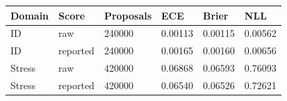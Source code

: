 \begin{tabular}{llllll}
\toprule
Domain & Score & Proposals & ECE & Brier & NLL \\
\midrule
ID & raw & 240000 & 0.00113 & 0.00115 & 0.00562 \\
ID & reported & 240000 & 0.00165 & 0.00160 & 0.00656 \\
Stress & raw & 420000 & 0.06868 & 0.06593 & 0.76093 \\
Stress & reported & 420000 & 0.06540 & 0.06526 & 0.72621 \\
\bottomrule
\end{tabular}
